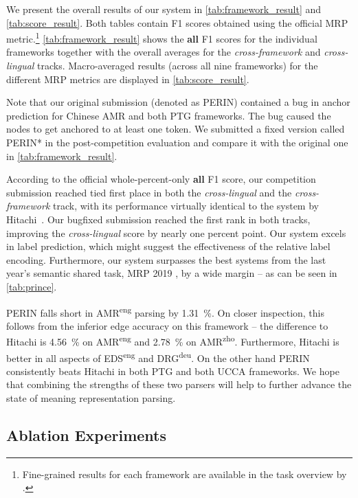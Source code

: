\documentclass[11pt,a4paper]{article}
\begin{document}
We present the overall results of our system in \autoref{tab:framework_result} and \autoref{tab:score_result}. Both tables contain F1 scores obtained using the official MRP metric.\hspace{-.08em}\footnote{Fine-grained results for each framework are available in the task overview by \citet{Oep:Abe:Abz:20}.} \autoref{tab:framework_result} shows the \textbf{all} F1 scores for the individual frameworks together with the overall averages for the \emph{cross-framework} and \emph{cross-lingual} tracks. Macro-averaged results (across all nine frameworks) for the different MRP metrics are displayed in \autoref{tab:score_result}.

Note that our original submission (denoted as PERIN) contained a bug in anchor prediction for Chinese AMR and both PTG frameworks. The bug caused the nodes to get anchored to at least one token. We submitted a fixed version called PERIN* in the post-competition evaluation and compare it with the original one in \autoref{tab:framework_result}.

According to the official whole-percent-only \textbf{all} F1 score, our competition submission reached tied first place in both the \emph{cross-lingual} and the \emph{cross-framework} track, with its performance virtually identical to the system by Hitachi~\cite{Oza:Mor:Kor:20}. Our bugfixed submission reached the first rank in both tracks, improving the \emph{cross-lingual} score by nearly one percent point. Our system excels in label prediction, which might suggest the effectiveness of the relative label encoding. Furthermore, our system surpasses the best systems from the last year's semantic shared task, MRP 2019 \cite{Oep:Abe:Haj:19}, by a wide margin -- as can be seen in \autoref{tab:prince}. 

PERIN falls short in AMR\textsuperscript{eng} parsing by 1.31~\%. On closer inspection, this follows from the inferior edge accuracy on this framework -- the difference to Hitachi is 4.56~\% on AMR\textsuperscript{eng} and 2.78~\% on AMR\textsuperscript{zho}. Furthermore, Hitachi is better in all aspects of EDS\textsuperscript{eng} and DRG\textsuperscript{deu}. On the other hand PERIN consistently beats Hitachi in both PTG and both UCCA frameworks. We hope that combining the strengths of these two parsers will help to further advance the state of meaning representation parsing.

\goodbreak
\subsection{Ablation Experiments}
\end{document}
